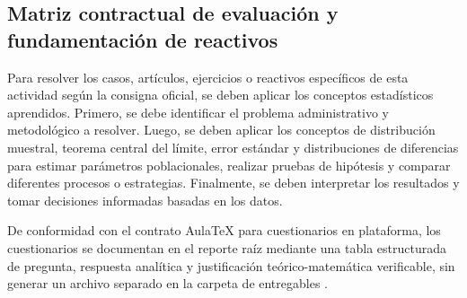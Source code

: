 {\subsection{Matriz contractual de evaluación y fundamentación de reactivos}
Para resolver los casos, artículos, ejercicios o reactivos específicos de esta actividad según la consigna oficial, se deben aplicar los conceptos estadísticos aprendidos. Primero, se debe identificar el problema administrativo y metodológico a resolver. Luego, se deben aplicar los conceptos de distribución muestral, teorema central del límite, error estándar y distribuciones de diferencias para estimar parámetros poblacionales, realizar pruebas de hipótesis y comparar diferentes procesos o estrategias. Finalmente, se deben interpretar los resultados y tomar decisiones informadas basadas en los datos.

De conformidad con el contrato AulaTeX para cuestionarios en plataforma, los cuestionarios se documentan en el reporte raíz mediante una tabla estructurada de pregunta, respuesta analítica y justificación teórico-matemática verificable, sin generar un archivo separado en la carpeta de entregables \citep{anderson2012,wackerly2010}.

}
